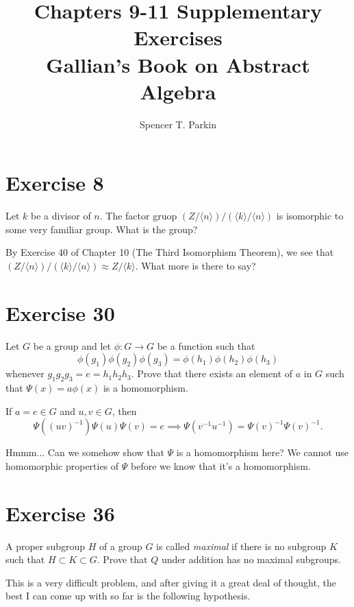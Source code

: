 \documentclass[12pt]{article}
\title{Chapters 9-11 Supplementary Exercises\\Gallian's Book on Abstract Algebra}
\author{Spencer T. Parkin}
\begin{document}
\maketitle

\section*{Exercise 8}

Let $k$ be a divisor of $n$.  The factor gruop $(Z/\langle n\rangle)/(\langle k\rangle/\langle n\rangle)$
is isomorphic to some very familiar group.  What is the group?

By Exercise 40 of Chapter 10 (The Third Isomorphism Theorem), we
see that $(Z/\langle n\rangle)/(\langle k\rangle/\langle n\rangle)\approx Z/\langle k\rangle$.
What more is there to say?

\section*{Exercise 30}

Let $G$ be a group and let $\phi:G\to G$ be a function such that
\begin{equation*}
\phi(g_1)\phi(g_2)\phi(g_3) = \phi(h_1)\phi(h_2)\phi(h_3)
\end{equation*}
whenever $g_1g_2g_3=e=h_1h_2h_3$.  Prove that there exists an element of $a$
in $G$ such that $\Psi(x)=a\phi(x)$ is a homomorphism.

If $a=e\in G$ and $u,v\in G$, then
\begin{equation*}
\Psi((uv)^{-1})\Psi(u)\Psi(v) = e\implies \Psi(v^{-1}u^{-1})=\Psi(v)^{-1}\Psi(v)^{-1}.
\end{equation*}

Hmmm...  Can we somehow show that $\Psi$ is a homomorphism here?
We cannot use homomorphic properties of $\Psi$ before we know that it's
a homomorphism.

\section*{Exercise 36}

A proper subgroup $H$ of a group $G$ is called {\it maximal} if there is no
subgroup $K$ such that $H\subset K\subset G$.  Prove that $Q$ under
addition has no maximal subgroups.

This is a very difficult problem, and after giving it a great deal of thought,
the best I can come up with so far is the following hypothesis.
\end{document}
